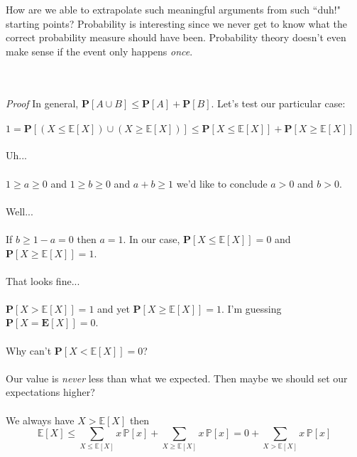 \documentclass[12pt]{article}
\begin{document}
{\begin{itemize}
\end{itemize}
How are we able to extrapolate such meaningful arguments from such ``duh!" starting points? Probability is interesting since we never get to know what the correct probability measure should have been.  Probability theory doesn't even make sense if the event only happens \textit{once}. \\ \\
\\
\textit{Proof} In general, $\mathbf{P}[A \cup B] \leq \mathbf{P}[A] + \mathbf{P}[B]$. Let's test our particular case:  \\ \\
$1 = \mathbf{P}[(X \leq \mathbb{E}[X]) \cup (X \geq \mathbb{E}[X])] \leq
\mathbf{P}[X \leq \mathbb{E}[X]] + \mathbf{P}[ X \geq \mathbb{E}[X]]  $ \\ \\
Uh...\\ \\
$1 \geq a \geq 0$ and $1 \geq b \geq 0$ and $a + b \geq 1$ we'd like to conclude $a > 0$ and $b > 0$. \\ \\
Well... \\ \\
If $b \geq 1 - a = 0$ then $a = 1$. In our case,  $\mathbf{P}[X \leq \mathbb{E}[X]] = 0$ and $\mathbf{P}[X \geq \mathbb{E}[X]] = 1$. \\ \\
That looks fine... \\ \\
$\mathbf{P}[X > \mathbb{E}[X]] = 1$ and yet $\mathbf{P}[X \geq \mathbb{E}[X]] = 1$. I'm guessing $\mathbf{P}[X = \mathbf{E}[X]] = 0$. \\ \\
Why can't $\mathbf{P}[X < \mathbb{E}[X]] = 0$? \\ \\
Our value is \textit{never} less than what we expected.  Then maybe we should set our expectations higher? \\ \\
We always have $X > \mathbb{E}[X]$ then
$$ \mathbb{E}[X] \leq \sum_{X \leq \mathbb{E}[X]} x\,\mathbb{P}[x] +  \sum_{X \geq \mathbb{E}[X]} x\,\mathbb{P}[x] = 0  +  \sum_{X >  \mathbb{E}[X]} x\,\mathbb{P}[x]  $$
}
\end{document}
